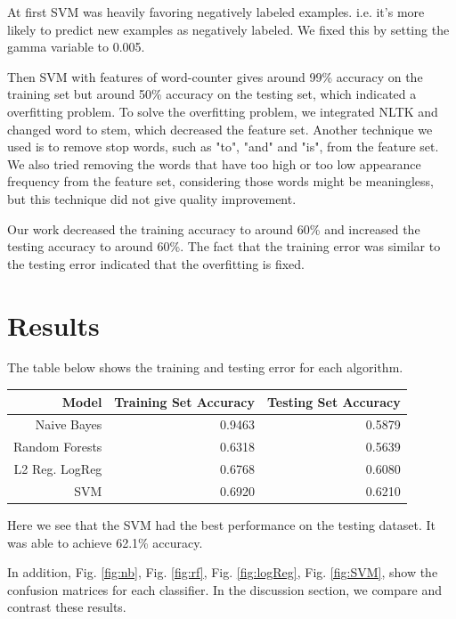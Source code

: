 \documentclass[journal]{IEEEtran}
\begin{document}
At first SVM was heavily favoring negatively labeled examples. i.e. it's more likely to predict new examples as negatively labeled. We fixed this by setting the gamma variable to 0.005.

Then SVM with features of word-counter gives around 99\% accuracy on the training set but around 50\% accuracy on the testing set, which indicated a overfitting problem. To solve the overfitting problem, we integrated NLTK and changed word to stem, which decreased the feature set. Another technique we used is to remove stop words, such as "to", "and" and "is", from the feature set. We also tried removing the words that have too high or too low appearance frequency from the feature set, considering those words might be meaningless, but this technique did not give quality improvement.

Our work decreased the training accuracy to around 60\% and increased the testing accuracy to around 60\%. The fact that the training error was similar to the testing error indicated that the overfitting is fixed. 

\section{Results}

The table below shows the training and testing error for each algorithm. 

\begin{table}[ht]
\centering
\begin{tabular}{rrr}
  \hline
Model & Training Set Accuracy & Testing Set Accuracy \\
  \hline
Naive Bayes &	0.9463 & 0.5879	\\
Random Forests & 0.6318 &  0.5639	 \\
L2 Reg. LogReg  &	0.6768 &	0.6080 \\
SVM & 0.6920 &  0.6210 \\
   \hline
\end{tabular}
\end{table}

Here we see that the SVM had the best performance on the testing dataset. It was able to achieve 62.1\% accuracy.

In addition, Fig.  \ref{fig:nb}, Fig.  \ref{fig:rf}, Fig.  \ref{fig:logReg}, Fig.  \ref{fig:SVM}, show the confusion matrices for each classifier. In the discussion section, we compare and contrast these results.
\end{document}
